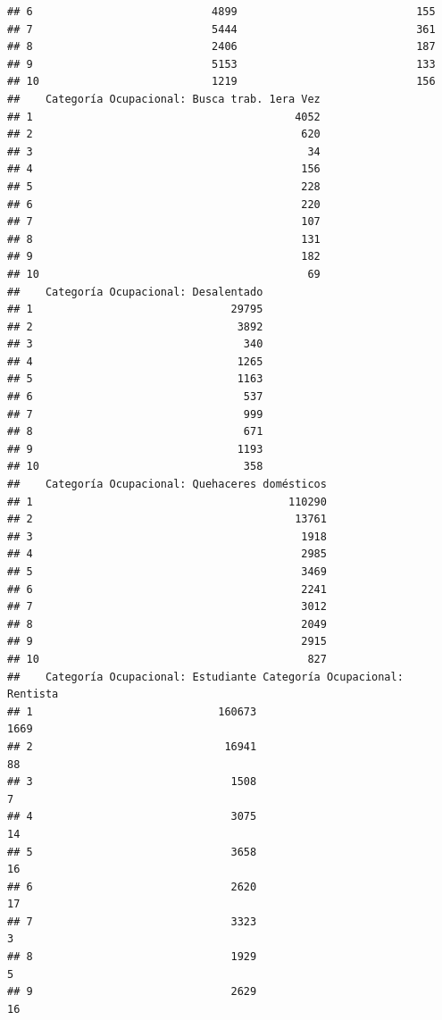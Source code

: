 \documentclass[11pt,]{article}
\begin{document}
\begin{verbatim}
## 6                            4899                            155
## 7                            5444                            361
## 8                            2406                            187
## 9                            5153                            133
## 10                           1219                            156
##    Categoría Ocupacional: Busca trab. 1era Vez
## 1                                         4052
## 2                                          620
## 3                                           34
## 4                                          156
## 5                                          228
## 6                                          220
## 7                                          107
## 8                                          131
## 9                                          182
## 10                                          69
##    Categoría Ocupacional: Desalentado
## 1                               29795
## 2                                3892
## 3                                 340
## 4                                1265
## 5                                1163
## 6                                 537
## 7                                 999
## 8                                 671
## 9                                1193
## 10                                358
##    Categoría Ocupacional: Quehaceres domésticos
## 1                                        110290
## 2                                         13761
## 3                                          1918
## 4                                          2985
## 5                                          3469
## 6                                          2241
## 7                                          3012
## 8                                          2049
## 9                                          2915
## 10                                          827
##    Categoría Ocupacional: Estudiante Categoría Ocupacional: Rentista
## 1                             160673                            1669
## 2                              16941                              88
## 3                               1508                               7
## 4                               3075                              14
## 5                               3658                              16
## 6                               2620                              17
## 7                               3323                               3
## 8                               1929                               5
## 9                               2629                              16

\end{verbatim}
\end{document}
